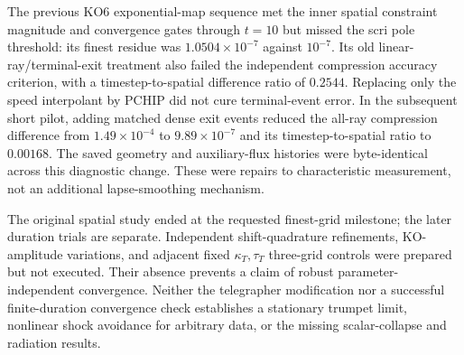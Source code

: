 The previous KO6 exponential-map sequence met the inner spatial constraint magnitude and convergence gates through $t=10$ but missed the scri pole threshold: its finest residue was $1.0504\times10^{-7}$ against $10^{-7}$. Its old linear-ray/terminal-exit treatment also failed the independent compression accuracy criterion, with a timestep-to-spatial difference ratio of $0.2544$. Replacing only the speed interpolant by PCHIP did not cure terminal-event error. In the subsequent short pilot, adding matched dense exit events reduced the all-ray compression difference from $1.49\times10^{-4}$ to $9.89\times10^{-7}$ and its timestep-to-spatial ratio to $0.00168$. The saved geometry and auxiliary-flux histories were byte-identical across this diagnostic change. These were repairs to characteristic measurement, not an additional lapse-smoothing mechanism.

The original spatial study ended at the requested finest-grid milestone; the later duration trials are separate. Independent shift-quadrature refinements, KO-amplitude variations, and adjacent fixed $\kappa_T,\tau_T$ three-grid controls were prepared but not executed. Their absence prevents a claim of robust parameter-independent convergence. Neither the telegrapher modification nor a successful finite-duration convergence check establishes a stationary trumpet limit, nonlinear shock avoidance for arbitrary data, or the missing scalar-collapse and radiation results.
